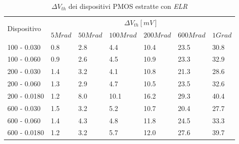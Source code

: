 \documentclass[12pt, letterpaper]{book}
\begin{document}
\begin{table}[H]
  \renewcommand{\arraystretch}{1.3}
  \begin{tabular}{m{2.1cm}  m{1.1cm} m{1.3cm} m{1.5cm} m{1.5cm} m{1.5cm} m{1cm}}
    \toprule
    \multirow{2}{*}{Dispositivo} & \multicolumn{6}{c}{$\Delta V_{th} [mV] $}                                                          \\
    \cmidrule{2-7}
                                 & $5Mrad$                                   & $50Mrad$ & $100Mrad$ & $200Mrad$ & $600Mrad$ & $1Grad$ \\
    \midrule
    100 - 0.030                     & 0.8                                       & 2.8      & 4.4       & 10.4      & 23.5      & 30.8    \\
    \hline
    100 - 0.060                     & 0.9                                       & 2.6      & 4.5       & 10.9      & 23.3      & 32.9    \\
    \hline
    200 - 0.030                     & 1.4                                       & 3.2      & 4.1       & 10.8      & 21.3      & 28.6    \\
    \hline
    200 - 0.060                     & 1.3                                       & 2.9      & 4.7       & 10.5      & 23.5      & 32.6    \\
    \hline
    200 - 0.0180                    & 1.2                                       & 8.0      & 10.1      & 16.2      & 29.3      & 40.4    \\
    \hline
    600 - 0.030                     & 1.5                                       & 3.2      & 5.2       & 10.7      & 20.4      & 27.7    \\
    \hline
    600 - 0.060                     & 1.4                                       & 4.3      & 4.8       & 11.8      & 24.5      & 33.3    \\
    \hline
    600 - 0.0180                    & 1.2                                       & 3.2      & 5.7       & 12.0      & 27.6      & 39.7    \\
    \bottomrule
  \end{tabular}
  \caption{$\Delta V_{th}$ dei dispositivi PMOS estratte con \emph{ELR}}
  \label{tab:deltaVthELRP}
\end{table}
\end{document}
